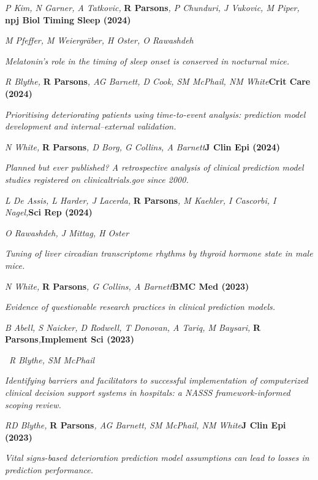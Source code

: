 \item
    \textit{P Kim, N Garner, A Tatkovic, }\textbf{R Parsons}\textit{, P Chunduri, J Vukovic, M Piper, }\textbf{\hfill{npj Biol Timing Sleep (2024)}}\par
	\textit{M Pfeffer, M Weiergr{\"a}ber, H Oster, O Rawashdeh}\par
    \textit{Melatonin’s role in the timing of sleep onset is conserved in nocturnal mice.}
\item
    \textit{R Blythe, }\textbf{R Parsons}\textit{, AG Barnett, D Cook, SM McPhail, NM White}\textbf{\hfill{Crit Care (2024)}}\par
    \textit{Prioritising deteriorating patients using time-to-event analysis: prediction model development and internal–external validation.}
\item
    \textit{N White, }\textbf{R Parsons}\textit{, D Borg, G Collins, A Barnett}\textbf{\hfill{J Clin Epi (2024)}}\par
    \textit{Planned but ever published? A retrospective analysis of clinical prediction model studies registered on clinicaltrials.gov since 2000.}
\item
	\textit{L De Assis, L Harder, J Lacerda, }\textbf{R Parsons}\textit{, M Kaehler, I Cascorbi, I Nagel,}\textbf{\hfill{Sci Rep (2024)}}\par
	\textit{O Rawashdeh, J Mittag, H Oster}\par
    \textit{Tuning of liver circadian transcriptome rhythms by thyroid hormone state in male mice.}
\item
    \textit{N White, }\textbf{R Parsons}\textit{, G Collins, A Barnett}\textbf{\hfill{BMC Med (2023)}}\par
    \textit{Evidence of questionable research practices in clinical prediction models.}
\item
    \textit{B Abell, S Naicker, D Rodwell, T Donovan, A Tariq, M Baysari, }\textbf{R Parsons}\textit{,}\textbf{\hfill{Implement Sci (2023)}}\par\
	\textit{R Blythe, SM McPhail}\par
    \textit{Identifying barriers and facilitators to successful implementation of computerized clinical decision support systems in hospitals: a NASSS framework-informed scoping review.}
\item
    \textit{RD Blythe, }\textbf{R Parsons}\textit{, AG Barnett, SM McPhail, NM White}\textbf{\hfill{J Clin Epi (2023)}}\par
    \textit{Vital signs-based deterioration prediction model assumptions can lead to losses in prediction performance.}
